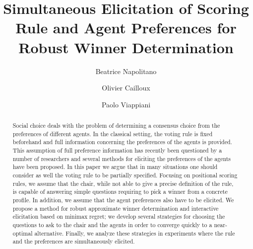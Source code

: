 \documentclass[runningheads]{llncs}
\begin{document}
%
\title{Simultaneous Elicitation of Scoring Rule and Agent Preferences for Robust Winner Determination}
%
%


\author{Beatrice Napolitano \and
Olivier Cailloux\and
Paolo Viappiani}
%
%

\maketitle              %
%
\begin{abstract}
\begin{sloppypar}
Social choice deals with the problem of determining a consensus choice from the preferences of different agents. In the classical setting, the voting rule is fixed beforehand and full information concerning the preferences of the agents is provided. This assumption of full preference information has recently been questioned by a number of researchers and several methods for eliciting the preferences of the agents have been proposed. In this paper we argue that in many situations one should consider as well the voting rule to be partially specified. Focusing on positional scoring rules, we assume that the chair, while not able to give a precise definition of the rule, is capable of answering simple questions requiring to pick a winner from a concrete profile. In addition, we assume that the agent preferences also have to be elicited. We propose a method for robust approximate winner determination and interactive elicitation based on minimax regret; we develop several strategies for choosing the questions to ask to the chair and the agents in order to converge quickly to a near-optimal alternative. Finally, we analyze these strategies in experiments where the rule and the preferences are simultaneously elicited.
\end{sloppypar}
\end{abstract}
%
%
%
\end{document}
